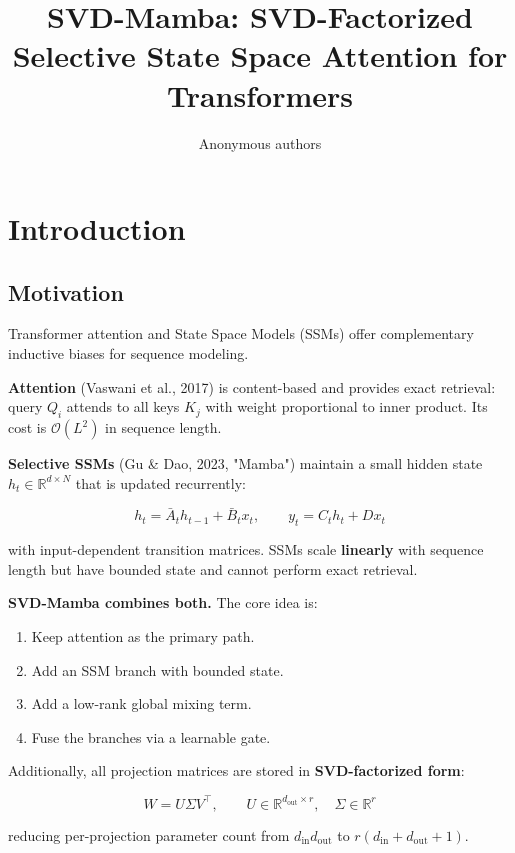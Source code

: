 \title{\textbf{SVD-Mamba: SVD-Factorized Selective State Space Attention for Transformers}}

\author{Anonymous authors}



\section{Introduction}

\subsection{Motivation}

Transformer attention and State Space Models (SSMs) offer complementary 
inductive biases for sequence modeling.

\textbf{Attention} (Vaswani et al., 2017) is content-based and provides exact 
retrieval: query $Q_i$ attends to all keys $K_j$ with weight proportional 
to inner product. Its cost is $\mathcal{O}(L^2)$ in sequence length.

\textbf{Selective SSMs} (Gu \& Dao, 2023, "Mamba") maintain a small hidden state 
$h_t \in \mathbb{R}^{d \times N}$ that is updated recurrently:

\[
h_t = \bar{A}_t h_{t-1} + \bar{B}_t x_t, \qquad
y_t = C_t h_t + D x_t
\tag{1.1}
\]

with input-dependent transition matrices. SSMs scale \textbf{linearly} with 
sequence length but have bounded state and cannot perform exact retrieval.

\textbf{SVD-Mamba combines both.} The core idea is:

\begin{enumerate}
\item Keep attention as the primary path.
\item Add an SSM branch with bounded state.
\item Add a low-rank global mixing term.
\item Fuse the branches via a learnable gate.

\end{enumerate}
Additionally, all projection matrices are stored in \textbf{SVD-factorized form}:

\[
W = U \Sigma V^\top, \qquad U \in \mathbb{R}^{d_\text{out} \times r}, \quad \Sigma \in \mathbb{R}^r
\tag{1.2}
\]

reducing per-projection parameter count from $d_\text{in} d_\text{out}$ 
to $r(d_\text{in} + d_\text{out} + 1)$.


